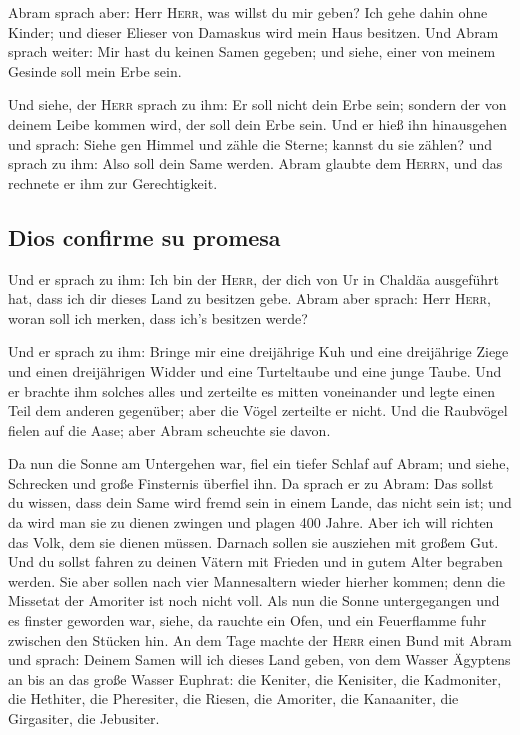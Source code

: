  Abram sprach aber: Herr \textsc{Herr}, was willst du mir
geben? Ich gehe dahin ohne Kinder; und dieser Elieser von Damaskus wird
mein Haus besitzen.  Und Abram sprach weiter: Mir hast du
keinen Samen gegeben; und siehe, einer von meinem Gesinde soll mein Erbe
sein.

 Und siehe, der \textsc{Herr} sprach zu ihm: Er soll nicht
dein Erbe sein; sondern der von deinem Leibe kommen wird, der soll dein
Erbe sein.  Und er hieß ihn hinausgehen und sprach: Siehe
gen Himmel und zähle die Sterne; kannst du sie zählen? und sprach zu
ihm: Also soll dein Same werden.  Abram glaubte dem
\textsc{Herrn}, und das rechnete er ihm zur Gerechtigkeit.

\hypertarget{dios-confirme-su-promesa}{%
\subsection{Dios confirme su promesa}\label{dios-confirme-su-promesa}}

 Und er sprach zu ihm: Ich bin der \textsc{Herr}, der dich
von Ur in Chaldäa ausgeführt hat, dass ich dir dieses Land zu besitzen
gebe.  Abram aber sprach: Herr \textsc{Herr}, woran soll
ich merken, dass ich's besitzen werde?

 Und er sprach zu ihm: Bringe mir eine dreijährige Kuh und
eine dreijährige Ziege und einen dreijährigen Widder und eine
Turteltaube und eine junge Taube.  Und er brachte ihm
solches alles und zerteilte es mitten voneinander und legte einen Teil
dem anderen gegenüber; aber die Vögel zerteilte er nicht.
 Und die Raubvögel fielen auf die Aase; aber Abram
scheuchte sie davon.

 Da nun die Sonne am Untergehen war, fiel ein tiefer
Schlaf auf Abram; und siehe, Schrecken und große Finsternis überfiel
ihn.  Da sprach er zu Abram: Das sollst du wissen, dass
dein Same wird fremd sein in einem Lande, das nicht sein ist; und da
wird man sie zu dienen zwingen und plagen 400 Jahre. 
Aber ich will richten das Volk, dem sie dienen müssen. Darnach sollen
sie ausziehen mit großem Gut.  Und du sollst fahren zu
deinen Vätern mit Frieden und in gutem Alter begraben werden.
 Sie aber sollen nach vier Mannesaltern wieder hierher
kommen; denn die Missetat der Amoriter ist noch nicht voll.
 Als nun die Sonne untergegangen und es finster geworden
war, siehe, da rauchte ein Ofen, und ein Feuerflamme fuhr zwischen den
Stücken hin.  An dem Tage machte der \textsc{Herr} einen
Bund mit Abram und sprach: Deinem Samen will ich dieses Land geben, von
dem Wasser Ägyptens an bis an das große Wasser Euphrat: 
die Keniter, die Kenisiter, die Kadmoniter,  die
Hethiter, die Pheresiter, die Riesen,  die Amoriter, die
Kanaaniter, die Girgasiter, die Jebusiter.


